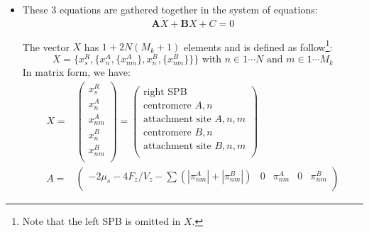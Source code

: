 \documentclass[a4paper,12pt]{article}
\begin{document}
\begin{itemize}
\item These 3 equations are gathered together in the system of equations:
$$
\mathbf{A}\dot{X} + \mathbf{B}X + C = 0
$$

The vector $X$ has $1 + 2N(M_k + 1)$ elements and is defined as
follow\footnote{Note that the left SPB is omitted in $X$.}:
\begin{equation*}
  X = \{x_s^R, \{x_n^A, \{x_{nm}^A\},  x_n^B,%
  \{x_{nm}^B \}\}\}\mbox{ with } n \in 1 \cdots N %
  \mbox{ and } m \in 1 \cdots M_k
\end{equation*}
In matrix form, we have:\\
\begin{equation}
  \begin{aligned}
    X = &%
    \begin{pmatrix}
      x_s^R\\
      x_n^A\\
      x_{nm}^A\\
      x_n^B\\
      x_{nm}^B\\
    \end{pmatrix} =%
    \begin{pmatrix}
      \text{right SPB}\\
      \text{centromere }A, n\\
      \text{attachment site }A, n,m\\
      \text{centromere }B, n\\
      \text{attachment site }B, n,m\\
    \end{pmatrix}\\
    A = &%
    \begin{pmatrix}
      - 2 \mu_s - 4 F_z/V_z - \sum (|\pi_{nm}^A| + |\pi_{nm}^B|)& 0 & \pi_{nm}^A &%
      0 &  \pi_{nm}^B\\


\end{pmatrix}
\end{aligned}
\end{equation}
\end{itemize}
\end{document}
